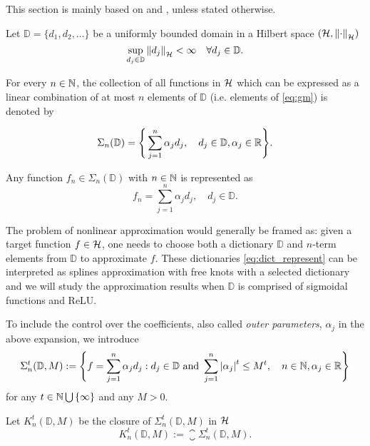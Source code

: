 This section is mainly based on \cite[Chapter 8]{devore_1998} and
\cite{vandervaartWeakConvergenceEmpirical1996}, unless stated otherwise.

Let $\mathbb{D} = \{d_1,d_2,\dots\}$ be a uniformly bounded domain in a Hilbert
space $(\mathcal{H}, \left\| \cdot \right\|_{\mathcal{H}})$
\begin{equation}
    \sup_{d_j\in \mathbb{D}} \left\| d_j \right\|_{\mathcal{H}} < \infty \quad 
    \forall d_j \in \mathbb{D}.
\end{equation}

For every $n \in \mathbb{N}$, the collection of all functions in $\mathcal{H}$
which can be expressed as a linear combination of at most $n$ elements of
$\mathbb{D}$ (i.e. elements of \eqref{eq:gm}) is denoted by

\begin{equation}
    \label{eq:dict_represent}
    \Sigma_n(\mathbb{D}) = \Bigg\{
        \sum_{j=1}^n \alpha_j d_j, \quad
        d_j \in \mathbb{D}, \alpha_j \in \mathbb{R}
    \Bigg\}.
\end{equation}

Any function $f_n \in \Sigma_n(\mathbb{D})$ with $n \in \mathbb{N}$ is represented as
\begin{equation}
    \label{eq:gm}
    f_n = \sum_{j=1}^n \alpha_j d_j, \quad d_j \in \mathbb{D}.
\end{equation}

The problem of nonlinear approximation would generally be framed as: given a
target function $f \in \mathcal{H}$, one needs to choose both a dictionary
$\mathbb{D}$ and $n$-term elements from $\mathbb{D}$ to approximate $f$. These
dictionaries \eqref{eq:dict_represent} can be interpreted as splines
approximation with free knots with a selected dictionary and we will study the
approximation results when $\mathbb{D}$ is comprised of sigmoidal functions and
ReLU.

To include the control over the coefficients, also called \textit{outer
parameters}, $\alpha_j$ in the above expansion, we introduce
\begin{equation}
    \label{eq:dict_sigma}
    \Sigma^{t}_n(\mathbb{D}, M) := \Bigg\{
        f = \sum_{j=1}^n \alpha_j d_j: 
        d_j \in \mathbb{D} \textnormal{ and } 
        \sum_{j=1}^n \left| \alpha_j \right|^t \leq M^t, \quad 
        n \in \mathbb{N}, \alpha_j \in \mathbb{R}
    \Bigg\}
\end{equation}
for any $t \in \mathbb{N} \bigcup\, \{\infty\}$ and any $M > 0$. 

Let $K^t_n(\mathbb{D}, M)$ be the closure of $\Sigma^t_n(\mathbb{D}, M)$ in
$\mathcal{H}$
\begin{equation}
    K^t_n(\mathbb{D}, M) := \closure{\Sigma^t_n(\mathbb{D}, M)}.
\end{equation}

